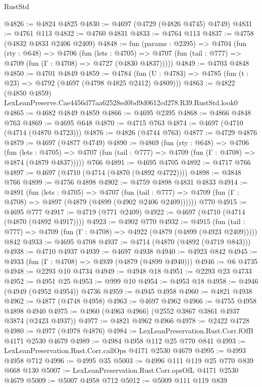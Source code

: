 \begin{lexlean}{RustStd}
\begin{coremodule}
@4826 := @4824 @4825
@4830 := @4697 (@4729 (@4826 @4745) @4749)
@4831 := @4761 @113
@4832 := @4760 @4831
@4833 := @4764 @113
@4837 := @4758 (@4832 @4833 @2406 @2409)
@4848 := fun (params : @2395) =>
  @4704
    (fun (rty : @648) =>
    @4706
      (fun (lets : @4705) =>
      @4707 (fun (tail : @777) => @4709 (fun (Γ : @4708) => @4727 (@4830 @4837)))))
@4849 := @4703 @4848
@4850 := @4701 @4849
@4859 := @4784 (fun (U : @4783) => @4785 (fun (t : @23) => @4792 (@4697 (@4798 @4825 @2412) @4809)))
@4863 := @4822 (@4850 @4859) LexLeanPreserve.Cae4456d77aa62528ed0bd9d0612cd278.R39.RustStd.look0
@4865 := @4682 @4849 @4859
@4866 := @4695 @2395
@4868 := @4866 @4848 @763
@4869 := @4695 @648
@4870 := @4715 @763
@4874 := @4697 (@4710 (@4714 (@4870 @4723)))
@4876 := @4826 (@4744 @763)
@4877 := @4729 @4876
@4879 := @4697 (@4877 @4749)
@4890 := @4869
    (fun (rty : @648) =>
    @4706
      (fun (lets : @4705) =>
      @4707 (fun (tail : @777) => @4709 (fun (Γ : @4708) => @4874 (@4879 @4837)))))
    @766
@4891 := @4695 @4705
@4892 := @4717 @766
@4897 := @4697 (@4710 (@4714 (@4870 (@4892 @4722))))
@4898 := @3848 @766
@4899 := @4756 @4898
@4902 := @4759 @4898 @4831 @4833
@4914 := @4891
    (fun (lets : @4705) =>
    @4707
      (fun (tail : @777) => @4709 (fun (Γ : @4708) => @4897 (@4879 (@4899 (@4902 @2406 @2409))))))
    @770
@4915 := @4695 @777
@4917 := @4719 (@771 @2409)
@4922 := @4697 (@4710 (@4714 (@4870 (@4892 @4917))))
@4923 := @4902 @770
@4932 := @4915
    (fun (tail : @777) => @4709 (fun (Γ : @4708) => @4922 (@4879 (@4899 (@4923 @2409)))))
    @842
@4933 := @4695 @4708
@4937 := @4714 (@4870 (@4892 (@4719 @843)))
@4938 := @4710 @4937
@4939 := @4697 @4938
@4940 := @4923 @842
@4945 := @4933 (fun (Γ : @4708) => @4939 (@4879 (@4899 @4940)))
@4946 := @6 @4735
@4948 := @2293 @10 @4734
@4949 := @4948 @18
@4951 := @2293 @23 @4733
@4952 := @4951 @25
@4953 := @999 @10
@4954 := @4953 @18
@4958 := @4946 (@4949 (@4952 @4954)) @4736
@4959 := @4945 @4958
@4960 := @4821 @4938
@4962 := @4877 (@4748 @4958)
@4963 := @4697 @4962
@4966 := @4755 @4958 @4898 @4940
@4975 := @4960 (@4963 @4966) (@2552 @3867 @3861 @4937 @3874 (@2423 @4937))
@4977 := @4821 @4962 @4966
@4978 := @2422 @4728
@4980 := @4977 (@4978 @4876)
@4984 := LexLeanPreservation.Rust.Corr.fOfB @4171 @2530 @4679
@4989 := @4984 @4958 @112 @25 @770 @841
@4993 := LexLeanPreservation.Rust.Corr.callOps @4171 @2530 @4679
@4995 := @4993 @4958 @712
@4996 := @4995 @35
@5003 := @4996 @111 @119 @25 @770 @839 @668 @130
@5007 := LexLeanPreservation.Rust.Corr.opsOfL @4171 @2530 @4679
@5009 := @5007 @4958 @712
@5012 := @5009 @111 @119 @839

\end{coremodule}
\end{lexlean}
